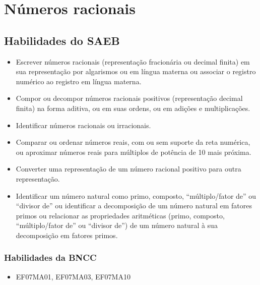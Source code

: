 
\chapter{Números racionais}

\section*{Habilidades do SAEB}

\begin{itemize}
\item Escrever números racionais (representação
fracionária ou decimal finita) em sua representação por algarismos ou em
língua materna ou associar o registro numérico ao registro em língua
materna.
\item
  Compor ou decompor números racionais positivos (representação decimal
  finita) na forma aditiva, ou em suas ordens, ou em adições e
  multiplicações.
\item
  Identificar números racionais ou irracionais.
\item
  Comparar ou ordenar números reais, com ou sem suporte da reta
  numérica, ou aproximar números reais para múltiplos de potência de 10
  mais próxima.
\item
  Converter uma representação de um número racional positivo para outra
  representação.
\item
  Identificar um número natural como primo, composto, ``múltiplo/fator
  de'' ou ``divisor de'' ou identificar a decomposição de um número
  natural em fatores primos ou relacionar as propriedades aritméticas
  (primo, composto, ``múltiplo/fator de'' ou ``divisor de'') de um
  número natural à sua decomposição em fatores primos.
\end{itemize}

\subsection{Habilidades da BNCC }

\begin{itemize}
\item EF07MA01, EF07MA03, EF07MA10
\end{itemize}


